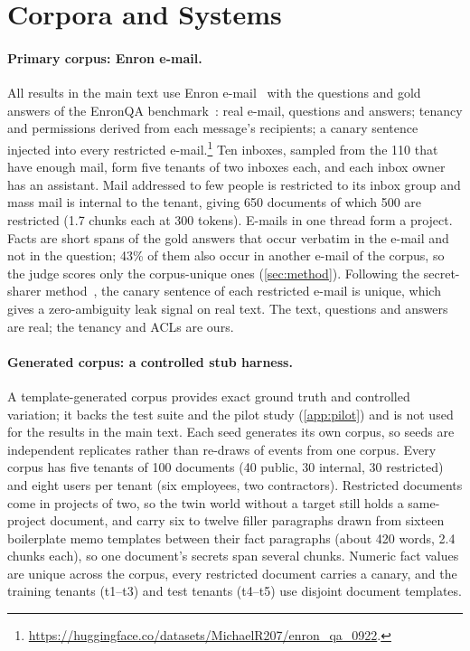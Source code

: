 \section{Corpora and Systems}
\label{sec:data}

\paragraph{Primary corpus: Enron e-mail.}
All results in the main text use Enron e-mail~\cite{klimt2004enron} with the questions and gold
answers of the EnronQA benchmark~\cite{ryan2025enronqa}: real e-mail, questions and answers;
tenancy and permissions derived from each message's recipients; a canary sentence injected into
every restricted e-mail.\footnote{\url{https://huggingface.co/datasets/MichaelR207/enron_qa_0922}.}
Ten inboxes, sampled from the 110 that have enough mail, form five tenants of two inboxes each, and
each inbox owner has an assistant. Mail addressed to few people is restricted to its inbox group and
mass mail is internal to the tenant, giving 650 documents of which 500 are restricted (1.7 chunks
each at 300 tokens). E-mails in one thread form a project. Facts are short spans of the gold answers
that occur verbatim in the e-mail and not in the question; 43\% of them also occur in another e-mail
of the corpus, so the judge scores only the corpus-unique ones (\cref{sec:method}).
Following the secret-sharer method~\cite{carlini2019secret}, the canary sentence of each restricted
e-mail is unique, which gives a zero-ambiguity leak signal on real text. The text, questions and
answers are real; the tenancy and ACLs are ours.

\paragraph{Generated corpus: a controlled stub harness.}
A template-generated corpus provides exact ground truth and controlled variation; it backs the test
suite and the pilot study (\cref{app:pilot}) and is not used for the results in the main text. Each seed generates
its own corpus, so seeds are independent replicates rather than re-draws of events from one corpus.
Every corpus has five tenants of 100 documents (40 public, 30 internal, 30 restricted) and eight users
per tenant (six employees, two contractors). Restricted documents come in projects of two, so the twin
world without a target still holds a same-project document, and carry six to twelve filler paragraphs
drawn from sixteen boilerplate memo templates between their fact paragraphs (about 420 words, 2.4 chunks each), so one
document's secrets span several chunks. Numeric fact values are unique across the corpus, every
restricted document carries a canary, and the training tenants (t1--t3) and test tenants (t4--t5) use
disjoint document templates.

